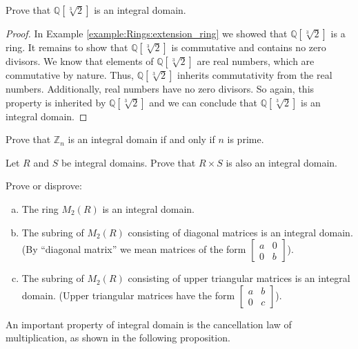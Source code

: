 \begin{example}{}
Prove that ${\mathbb Q}[\sqrt[3]{2}]$ is an integral domain.

\begin{proof}
In Example \ref{example:Rings:extension_ring} we showed that ${\mathbb Q}[\sqrt[3]{2}]$ is a ring.  It remains to show that ${\mathbb Q}[\sqrt[3]{2}]$ is commutative and contains no zero divisors.  We know that elements of ${\mathbb Q}[\sqrt[3]{2}]$ are real numbers, which are commutative by nature.  Thus, ${\mathbb Q}[\sqrt[3]{2}]$ inherits commutativity from the real numbers.  Additionally, real numbers have no zero divisors.  So again, this property is inherited by ${\mathbb Q}[\sqrt[3]{2}]$ and we can conclude that ${\mathbb Q}[\sqrt[3]{2}]$ is an integral domain.
\end{proof}
\end{example}

\begin{exercise}{}
Prove that  ${\mathbb Z}_n$ is an integral domain if and only if $n$ is prime.
\end{exercise}

\begin{exercise}{}
Let $R$ and $S$ be integral domains. Prove that $R\times S$ is also an integral domain.
\end{exercise}

\begin{exercise}{}
Prove or disprove:
\begin{enumerate}[(a)]
\item
The ring $M_2(R)$ is an integral domain.
\item
The subring of $M_2(R)$ consisting of diagonal matrices is an integral domain. (By ``diagonal matrix'' we mean matrices of the form 
$ \begin{bmatrix}
a & 0 \\ 0 & b
\end{bmatrix}$).
\item
The subring of $M_2(R)$ consisting of upper triangular matrices is an integral domain. (Upper triangular matrices have the form 
$ \begin{bmatrix}
a & b \\ 0 & c
\end{bmatrix}$).
\end{enumerate}
\end{exercise}

An important property of integral domain is the cancellation law of multiplication, as shown in the following proposition.

